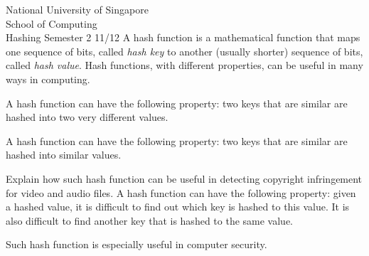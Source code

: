 \documentclass[answers,a4paper,11pt]{exam}
\begin{document}
\extraheadheight{.5in}
%
{\large\sf National University of Singapore\\ School of Computing \\
\LARGE\sf Hashing}%
{\large\sf Semester 2 11/12}
\firstpageheadrule
\pagestyle{headandfoot}
A hash function is a mathematical function that maps one sequence of bits, called \textit{hash key} to another (usually shorter) sequence of bits, called \textit{hash value}.  Hash functions, with different properties, can be useful in many ways in computing.

\begin{questions}
\question
A hash function can have the following property: two keys that are similar are hashed into two very different values.

\newpage
\question
A hash function can have the following property: two keys that are similar are hashed into similar values.

Explain how such hash function can be useful in detecting copyright infringement for video and audio files.
\fillwithdottedlines{3in}
\question
A hash function can have the following property: given a hashed value, it is difficult to find out which key is hashed to this value.  It is also difficult to find another key that is hashed to the same value.

Such hash function is especially useful in computer security.
\end{questions}
\end{document}
